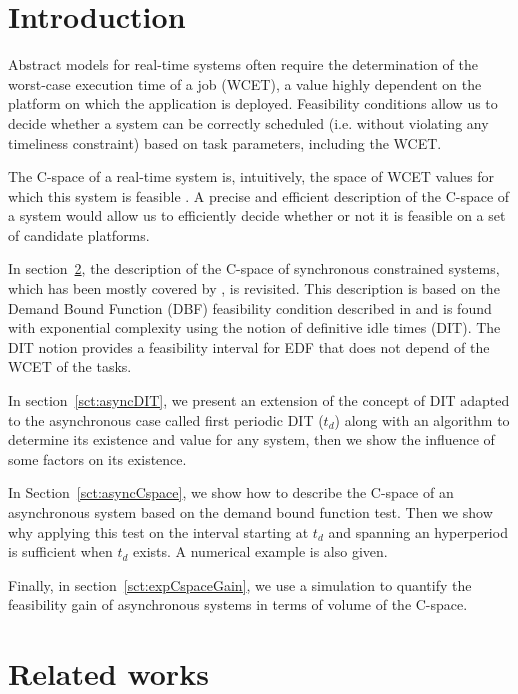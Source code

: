 \documentclass[conference]{IEEEtran}
\begin{document}
\section{Introduction}

	Abstract models for real-time systems often require the determination of the
	worst-case execution time of a job (WCET), a value highly dependent on the
	platform on which the application is deployed. Feasibility conditions allow us to
	decide whether a system can be correctly scheduled (i.e. without violating any
	timeliness constraint) based on task parameters, including the WCET.

	The \mbox{C-space} of a real-time system is, intuitively,
	the space of WCET values for which this system is feasible
	\cite{bini2004schedulability,george2009characterization}. A precise and efficient description of the C-space of a system would allow us to efficiently decide whether or not it is feasible on a set of candidate platforms.

	In section~\ref{sct:relatedWorks}, the description of the C-space of synchronous
	constrained systems, which has been mostly covered by \cite{george2009characterization}, is revisited.
	This description is based on the Demand Bound Function (DBF) feasibility condition described in
	\cite{baruah1999generalized,baruah1990algorithms} and is found with exponential complexity using
	the notion of definitive idle times (DIT). The DIT notion provides a feasibility interval for EDF that does not depend of the WCET of the tasks.

	In section~\ref{sct:asyncDIT}, we present an extension of the concept of DIT adapted to the
	asynchronous case called first periodic DIT
	($t_d$) along with an algorithm to determine its existence and value for any system,
	then we show the influence of some factors on its existence.

	In Section~\ref{sct:asyncCspace}, we show how to describe the C-space of an asynchronous
	system based on the demand bound function test. Then we show why applying this
	test on the interval starting at $t_d$
	and spanning an hyperperiod is sufficient when $t_d$ exists. A
	numerical example is also given.

	Finally, in section~\ref{sct:expCspaceGain}, we use a simulation to quantify the feasibility
	gain of asynchronous systems in terms of volume of the C-space.

\section{Related works}
\label{sct:relatedWorks}
\end{document}
